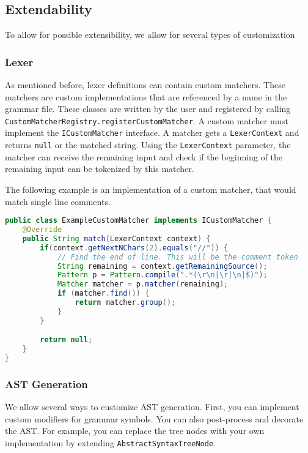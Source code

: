 \subsection{Extendability}

To allow for possible extensibility, we allow for several types of customization

\subsubsection{Lexer}

As mentioned before, lexer definitions can contain custom matchers. 
These matchers are custom implementations that are referenced by a name in the grammar file. 
These classes are written by the user and registered by calling \lstinline|CustomMatcherRegistry.registerCustomMatcher|. 
A custom matcher must implement the \verb|ICustomMatcher| interface. 
A matcher gets a \verb|LexerContext| and returns \verb|null| or the matched string. 
Using the \verb|LexerContext| parameter, the matcher can receive the remaining input and check if the beginning of the remaining input can be tokenized by this matcher.

The following example is an implementation of a custom matcher, that would match single line comments.

\begin{lstlisting}[language=Java, caption=Example of a custom matcher]
public class ExampleCustomMatcher implements ICustomMatcher {
    @Override
    public String match(LexerContext context) {
        if(context.getNextNChars(2).equals("//")) {
            // Find the end of line. This will be the comment token
            String remaining = context.getRemainingSource();
            Pattern p = Pattern.compile(".*(\r\n|\r|\n|$)");
            Matcher matcher = p.matcher(remaining);
            if (matcher.find()) {
                return matcher.group();
            }
        }

        return null;
    }
}
\end{lstlisting}

\subsubsection{AST Generation}

We allow several ways to customize AST generation. 
First, you can implement custom modifiers for grammar symbols.
You can also post-process and decorate the AST. 
For example, you can replace the tree nodes with your own implementation by extending \verb|AbstractSyntaxTreeNode|.

